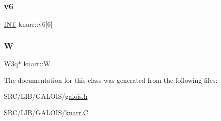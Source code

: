 \subsubsection{\texorpdfstring{v6}{v6}}
{\footnotesize\ttfamily \mbox{\hyperlink{galois_8h_a09fddde158a3a20bd2dcadb609de11dc}{I\+NT}} knarr\+::v6\mbox{[}6\mbox{]}}

\mbox{\label{classknarr_afe8b72e915cfb715bfb78bc8cc33bc81}} 
\subsubsection{\texorpdfstring{W}{W}}
{\footnotesize\ttfamily \mbox{\hyperlink{class_w3q}{W3q}}$\ast$ knarr\+::W}



The documentation for this class was generated from the following files\+:\begin{DoxyCompactItemize}
\item 
S\+R\+C/\+L\+I\+B/\+G\+A\+L\+O\+I\+S/\mbox{\hyperlink{galois_8h}{galois.\+h}}\item 
S\+R\+C/\+L\+I\+B/\+G\+A\+L\+O\+I\+S/\mbox{\hyperlink{knarr_8_c}{knarr.\+C}}\end{DoxyCompactItemize}
